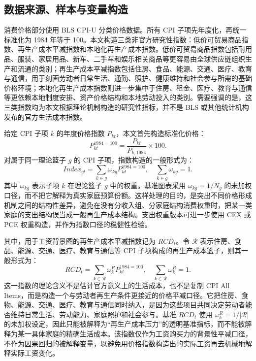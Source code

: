 \documentclass[12pt,a4paper,fontset=none]{ctexart}
\begin{document}
\subsection{数据来源、样本与变量构造}

消费价格部分使用 BLS CPI-U 分类价格数据。所有 CPI 子项先年度化，再统一标准化为 1984 年等于 100。本文构造三类非官方研究性指数：低价可贸易商品指数、再生产成本平减指数和本地化再生产成本指数。低价可贸易商品指数包括耐用品、服装、家居用品、新车、二手车和娱乐相关商品等更容易由全球供应链组织生产和流通的类别；再生产成本平减指数包括住房、食品、能源、交通、医疗、教育与通信，用于刻画劳动者日常生活、通勤、照护、健康维持和社会参与所需的基础价格环境；本地化再生产成本指数则进一步集中于住房、租金、医疗、教育与通信等更依赖本地制度安排、资产价格结构和本地劳动投入的类别。需要强调的是，这三类指数均为本文根据理论机制构造的研究性指标，并不是 BLS 或其他统计机构发布的官方生活成本指数。

给定 CPI 子项 \(k\) 的年度价格指数 \(P_{kt}\)，本文首先构造标准化价格：
\begin{equation}
P^{1984=100}_{kt}=\frac{P_{kt}}{P_{k,1984}}\times 100.
\end{equation}
对属于同一理论篮子 \(g\) 的 CPI 子项，指数构造的一般形式为：
\begin{equation}
Index_{gt}=\sum_{k\in g}\omega_{kg}P^{1984=100}_{kt},
\quad
\sum_{k\in g}\omega_{kg}=1.
\end{equation}
其中 \(\omega_{kg}\) 表示子项 \(k\) 在理论篮子 \(g\) 中的权重。基准图表采用 \(\omega_{kg}=1/N_g\) 的未加权口径，而不把它解释为真实家庭预算份额。这样处理的目的，是突出不同价格形成机制之间的结构性差异，避免在没有分收入组、分家庭结构消费权重时，把某一类家庭的支出结构误当成一般再生产成本结构。支出权重版本可进一步使用 CEX 或 PCE 权重构造，并作为指数口径的稳健性检验。

其中，用于工资背景图的再生产成本平减指数记为 \(RCD_t\)。令 \(\mathcal R\) 表示住房、食品、能源、交通、医疗、教育与通信等 CPI 子项构成的再生产成本篮子，则其一般形式为：
\begin{equation}
RCD_t=\sum_{k\in \mathcal R}\omega^{R}_{k}P^{1984=100}_{kt},
\quad
\sum_{k\in \mathcal R}\omega^{R}_{k}=1.
\end{equation}
这一指数的理论含义不是估计官方意义上的生活成本，也不是复制 CPI All Items，而是构造一个与劳动者再生产条件更接近的价格平减口径。它把住房、食物、能源、交通、医疗、教育与通信同时纳入，是因为这些项目共同决定劳动者能否维持日常生活、劳动能力、家庭照护和社会参与。基准 \(RCD_t\) 使用 \(\omega^{R}_{k}=1/|\mathcal R|\) 的未加权设定，因此只能被解释为“再生产成本压力”的透明基准指标，而不能被解释为某一具体家庭的精确生活成本。该指数仅作为工资购买力的背景性平减口径，不作为因果回归的被解释变量，以避免用价格指数构造出的实际工资再去机械地解释实际工资变化。
\end{document}
